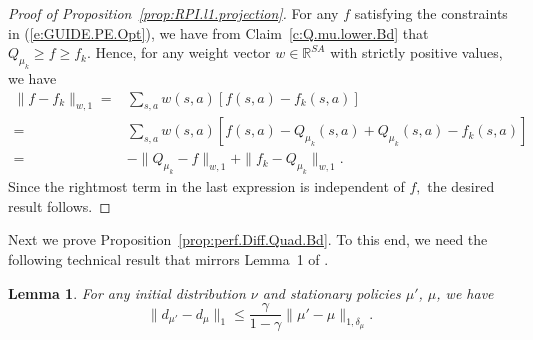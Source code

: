 \documentclass[twoside]{article}
\theoremstyle{plain}
\newtheorem{lemma}[theorem]{Lemma}
\theoremstyle{definition}
\theoremstyle{remark}
\newcommand{\bR}{\mathbb{R}}
\newcommand{\mup}{\mu'}
\renewcommand{\eqref}[1]{(\ref{#1})}
\begin{document}
\begin{proof}[Proof of Proposition~\ref{prop:RPI.l1.projection}]
%
For any $f$ satisfying the constraints in \eqref{e:GUIDE.PE.Opt}, we have from Claim~\ref{c:Q.mu.lower.Bd} that  $Q_{\mu_k} \geq f \geq f_k.$ Hence, for any weight vector $w \in \bR^{SA}$ with strictly positive values, we have
%
\begin{align*}
    \|f - f_k\|_{w, 1} = {} & \sum_{s, a} w(s, a) [f(s, a) - f_k(s, a)] \\
    = {} & \sum_{s, a} w(s, a) [f(s, a) - Q_{\mu_k}(s, a)  + Q_{\mu_k}(s, a) - f_k(s, a)]\\
    = {} & -\|Q_{\mu_k} - f\|_{w, 1} + \|f_k - Q_{\mu_k}\|_{w, 1}.
\end{align*}
%
Since the rightmost term in the last expression is independent of $f,$ the desired result follows. 
%
\end{proof}

Next we prove Proposition~\ref{prop:perf.Diff.Quad.Bd}. To this end, we need the following technical result that mirrors Lemma~1 of \citep{metelli2021safe}. 

\begin{lemma}
 \label{lem:Discounted.State.Distrn.Diff.Lemma}
 For any initial distribution $\nu$ and stationary policies $\mup$, $\mu$, we have
% 
 \begin{equation}
 \label{e:disc.state.diff.lemma}
 \|d_{\mup} - d_{\mu}\|_1 \leq \frac{\gamma}{1 - \gamma} \|\mup - \mu\|_{1, \delta_\mu}. 
 \end{equation}
% 
 \end{lemma}
%
\end{document}
